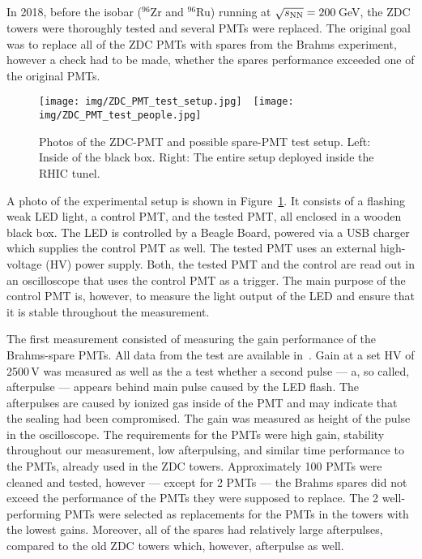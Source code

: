 In 2018, before the isobar (${}^{96}$Zr and ${}^{96}$Ru) running at $\sqrt{s_\text{NN}} = 200\,$GeV, the ZDC towers were thoroughly tested and several PMTs were replaced. The original goal was to replace all of the ZDC PMTs with spares from the Brahms experiment, however a check had to be made, whether the spares performance exceeded one of the original PMTs.

\begin{figure}[!htb]
\begin{center}
 \texttt{[image: img/ZDC\_PMT\_test\_setup.jpg]}$\quad$\texttt{[image: img/ZDC\_PMT\_test\_people.jpg]}
\end{center}
\caption{\label{photo_ZDC_PTM_setup}Photos of the ZDC-PMT and possible spare-PMT test setup. Left: Inside of the black box. Right: The entire setup deployed inside the RHIC tunel.}
\end{figure}

A photo of the experimental setup is shown in Figure~\ref{photo_ZDC_PTM_setup}\@. It consists of a flashing weak LED light, a control PMT, and the tested PMT, all enclosed in a wooden black box. The LED is controlled by a Beagle Board, powered via a USB charger which supplies the control PMT as well. The tested PMT uses an external high-voltage (HV) power supply. Both, the tested PMT and the control are read out in an oscilloscope that uses the control PMT as a trigger. The main purpose of the control PMT is, however, to measure the light output of the LED and ensure that it is stable throughout the measurement.

The first measurement consisted of measuring the gain performance of the Brahms-spare PMTs. All data from the test are available in~\cite{PMT_spreadsheet}\@. Gain at a set HV of 2500$\,$V was measured as well as the a test whether a second pulse --- a, so called, afterpulse --- appears behind main pulse caused by the LED flash. The afterpulses are caused by ionized gas inside of the PMT and may indicate that the sealing had been compromised. The gain was measured as height of the pulse in the oscilloscope. The requirements for the PMTs were high gain, stability throughout our measurement, low afterpulsing, and similar time performance to the PMTs, already used in the ZDC towers. Approximately 100 PMTs were cleaned and tested, however --- except for 2 PMTs --- the Brahms spares did not exceed the performance of the PMTs they were supposed to replace. The 2 well-performing PMTs were selected as replacements for the PMTs in the towers with the lowest gains. Moreover, all of the spares had relatively large afterpulses, compared to the old ZDC towers which, however, afterpulse as well.


